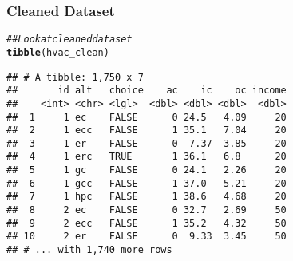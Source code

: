 \documentclass{beamer}\usepackage[]{graphicx}\usepackage[]{xcolor}
\makeatletter
\newcommand{\hlnum}[1]{\textcolor[rgb]{0.686,0.059,0.569}{#1}}%
\newcommand{\hlcom}[1]{\textcolor[rgb]{0.678,0.584,0.686}{\textit{#1}}}%
\newcommand{\hlopt}[1]{\textcolor[rgb]{0,0,0}{#1}}%
\newcommand{\hlstd}[1]{\textcolor[rgb]{0.345,0.345,0.345}{#1}}%
\newcommand{\hlkwb}[1]{\textcolor[rgb]{0.69,0.353,0.396}{#1}}%
\newcommand{\hlkwc}[1]{\textcolor[rgb]{0.333,0.667,0.333}{#1}}%
\newcommand{\hlkwd}[1]{\textcolor[rgb]{0.737,0.353,0.396}{\textbf{#1}}}%
\newenvironment{kframe}{%
 \def\at@end@of@kframe{}%
 \ifinner\ifhmode%
  \def\at@end@of@kframe{\end{minipage}}%
  \begin{minipage}{\columnwidth}%
 \fi\fi%
 \def\FrameCommand##1{\hskip\@totalleftmargin \hskip-\fboxsep
 \colorbox{shadecolor}{##1}\hskip-\fboxsep
     \hskip-\linewidth \hskip-\@totalleftmargin \hskip\columnwidth}%
 \MakeFramed {\advance\hsize-\width
   \@totalleftmargin\z@ \linewidth\hsize
   \@setminipage}}%
 {\par\unskip\endMakeFramed%
 \at@end@of@kframe}
\newenvironment{knitrout}{}{} %
\makeatother
\begin{document}

\begin{frame}[fragile]\frametitle{Cleaned Dataset}
\begin{knitrout}\footnotesize
{}\color{fgcolor}\begin{kframe}
\begin{alltt}
\hlcom{## Look at cleaned dataset}
\hlkwd{tibble}\hlstd{(hvac_clean)}
\end{alltt}
\begin{verbatim}
## # A tibble: 1,750 x 7
##       id alt   choice    ac    ic    oc income
##    <int> <chr> <lgl>  <dbl> <dbl> <dbl>  <dbl>
##  1     1 ec    FALSE      0 24.5   4.09     20
##  2     1 ecc   FALSE      1 35.1   7.04     20
##  3     1 er    FALSE      0  7.37  3.85     20
##  4     1 erc   TRUE       1 36.1   6.8      20
##  5     1 gc    FALSE      0 24.1   2.26     20
##  6     1 gcc   FALSE      1 37.0   5.21     20
##  7     1 hpc   FALSE      1 38.6   4.68     20
##  8     2 ec    FALSE      0 32.7   2.69     50
##  9     2 ecc   FALSE      1 35.2   4.32     50
## 10     2 er    FALSE      0  9.33  3.45     50
## # ... with 1,740 more rows
\end{verbatim}
\end{kframe}
\end{knitrout}
\end{frame}
\end{document}
